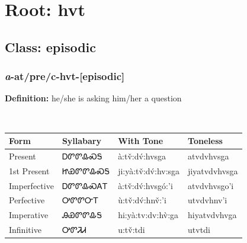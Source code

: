 \needspace{4in}
\section*{Root: hvt}
\nopagebreak
{}
\needspace{3in}
\subsection*{Class: episodic}
\nopagebreak
\needspace{2in}
\subsubsection*{\textit{a}{-}at/pre/c{-}\textbf{hvt}{-}[episodic]}
\nopagebreak
\textbf{Definition: } he/she is asking him/her a question
\\[0.5em]
\begin{tabularx}{\textwidth}{l X X X}%
\toprule%
\textbf{Form}&\textbf{Syllabary}&\textbf{With Tone}&\textbf{Toneless}\\%
\midrule%
Present&ᎠᏛᏛᎲᏍᎦ&à:tv̌:dv́:hvsga&atvdvhvsga\\%
1st Present&ᏥᏯᏛᏛᎲᏍᎦ&ji:yà:tv̌:dv́:hv:sga&jiyatvdvhvsga\\%
Imperfective&ᎠᏛᏛᎲᏍᎪᎢ&à:tv̌:dv́:hvsgó:’i&atvdvhvsgo’i\\%
Perfective&ᎤᏛᏛᏅᎢ&ù:tv̌:dv́:hnv̌:’i&utvdvhnv’i\\%
Imperative&ᎯᏯᏛᏛᎲᎦ&hi:yà:tv:dv:hv̀:ga&hiyatvdvhvga\\%
Infinitive&ᎤᏛᏘᏗ&u:tv̌:tdi&utvtdi\\%
\bottomrule%
\end{tabularx}
\\[1em]